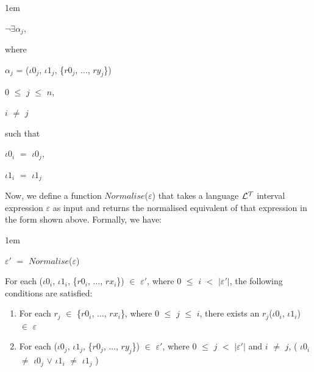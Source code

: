 \documentclass[11pt]{report}
\newenvironment{vquote}
{
  \begin{list}{}{\leftmargin 1em}\item[]
}
{
  \end{list}
}
\begin{document}
            \begin{vquote}
              $\lnot$$\exists$${\alpha}_j$,

              where

              \hspace{1em}
              ${\alpha}_j$ =
                (${\iota}0_j$, ${\iota}1_j$, \{$r0_j$, $\ldots$, $ry_j$\})

              \hspace{1em}
              $0$ $\leq$ $j$ $\leq$ $n$,

              \hspace{1em}
              $i$ $\neq$ $j$

              such that

              \hspace{1em}
              ${\iota}0_i$ $=$ ${\iota}0_j$,

              \hspace{1em}
              ${\iota}1_i$ $=$ ${\iota}1_j$
            \end{vquote}

            Now, we define a function $Normalise$($\varepsilon$) that takes
            a language ${\cal L^T}$ interval expression $\varepsilon$ as
            input and returns the normalised equivalent of that expression in
            the form shown above. Formally, we have:

            \begin{vquote}
              ${\varepsilon}'$ $=$ $Normalise$($\varepsilon$)
            \end{vquote}

            \noindent
            For each
            (${\iota}0_i$, ${\iota}1_i$, \{$r0_i$, $\ldots$, $rx_i$\})
            $\in$ ${\varepsilon}'$,
            where $0$ $\leq$ $i$ $<$ $|{\varepsilon}'|$, the following
            conditions are satisfied:

            \begin{enumerate}
              \item
                For each $r_j$ $\in$ \{$r0_i$, $\ldots$, $rx_i$\}, where $0$
                $\leq$ $j$ $\leq$ $i$, there exists an
                $r_j$(${\iota}0_i$, ${\iota}1_i$) $\in$ $\varepsilon$

              \item
                For each
                (${\iota}0_j$, ${\iota}1_j$, \{$r0_j$, $\ldots$, $ry_j$\})
                $\in$ ${\varepsilon}'$, where $0$ $\leq$ $j$ $<$
                $|{\varepsilon}'|$ and $i$ $\neq$ $j$,
                (
                  ${\iota}0_i$ $\neq$ ${\iota}0_j$ $\lor$
                  ${\iota}1_i$ $\neq$ ${\iota}1_j$
                )
            \end{enumerate}
\end{document}
